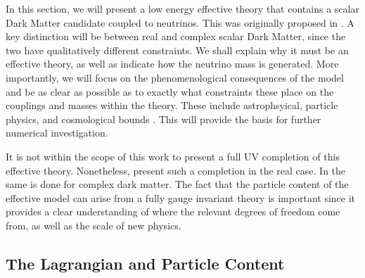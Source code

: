 \documentclass[11pt]{article}
\numberwithin{equation}{section}
\numberwithin{figure}{section}
\numberwithin{table}{section}
\begin{document}
In this section, we will present a low energy effective theory that contains a scalar Dark Matter candidate coupled to neutrinos. This was originally proposed in \cite{Farzan2014, Farzan2011, Farzan2010, Boehm2006, Farzan2009}. A key distinction will be between real and complex scalar Dark Matter, since the two have qualitatively different constraints. We shall explain why it must be an effective theory, as well as indicate how the neutrino mass is generated. More importantly, we will focus on the phenomenological consequences of the model and be as clear as possible as to exactly what constraints these place on the couplings and masses within the theory. These include astrophsyical, particle physics, and cosmological bounds \cite{Farzan2014, Farzan2011, Farzan2010, Boehm2006, Farzan2009}. This will provide the basis for further numerical investigation.


It is not within the scope of this work to present a full UV completion of this effective theory. Nonetheless, \cite{Farzan2009, Farzan2010} present such a completion in the real case. In \cite{Farzan2010a} the same is done for complex dark matter. The fact that the particle content of the effective model can arise from a fully gauge invariant theory is important since it provides a clear understanding of where the relevant degrees of freedom come from, as well as the scale of new physics.



\subsection{The Lagrangian and Particle Content}
\end{document}
